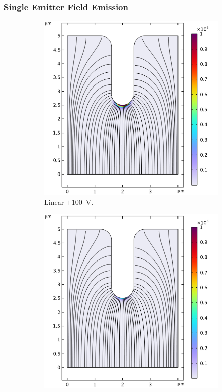 \begin{refsection}
\subsubsection{Single Emitter Field Emission}
\begin{figure}[H]
    \centering
    \begin{subfigure}[b]{0.45\linewidth}
        \includegraphics[width=\linewidth]{Chapter7/Figs/Raster/Comsol/+100_J_GM_smol.png}
        \caption{Linear $+100$~\si{\volt}.}
        \label{fig:c_+100_j_gm}
    \end{subfigure}
    \hfill %
    \begin{subfigure}[b]{0.45\linewidth}
        \includegraphics[width=\linewidth]{Chapter7/Figs/Raster/Comsol/-100_J_GM_smol.png}

\end{subfigure}
\end{figure}
\end{refsection}
